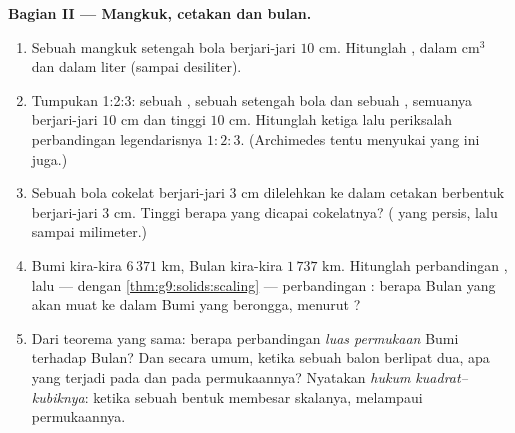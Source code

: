 \begin{problem}
\medskip
\noindent\textbf{Bagian II --- Mangkuk, cetakan dan bulan.}
\begin{enumerate}[resume]
  \item Sebuah mangkuk setengah bola berjari-jari $10$ cm. Hitunglah
        , dalam cm$^3$ dan dalam liter (sampai desiliter).
  \item Tumpukan 1:2:3: sebuah , sebuah setengah bola dan
        sebuah , semuanya berjari-jari $10$ cm dan tinggi
        $10$ cm. Hitunglah ketiga  lalu periksalah
        perbandingan legendarisnya
        $1 : 2 : 3$. (Archimedes tentu menyukai yang ini juga.)
  \item Sebuah bola cokelat berjari-jari $3$ cm dilelehkan ke dalam
        cetakan berbentuk  berjari-jari $3$ cm. Tinggi berapa
        yang dicapai cokelatnya? ( yang persis, lalu sampai
        milimeter.)
  \item {} Bumi kira-kira $6\,371$ km,  Bulan
        kira-kira $1\,737$ km. Hitunglah perbandingan ,
        lalu --- dengan \cref{thm:g9:solids:scaling} --- perbandingan
        : berapa Bulan yang akan muat ke dalam Bumi yang
        berongga, menurut ?
  \item Dari teorema yang sama: berapa perbandingan
        \emph{luas permukaan} Bumi terhadap Bulan? Dan secara umum,
        ketika  sebuah balon berlipat dua, apa yang terjadi
        pada  dan pada permukaannya? Nyatakan \emph{hukum
        kuadrat--kubiknya}: ketika sebuah bentuk membesar skalanya,
         melampaui permukaannya.
\end{enumerate}


\end{problem}
